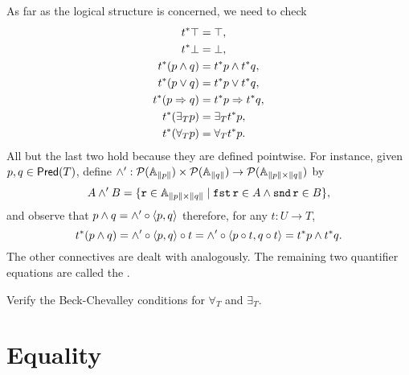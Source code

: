 As far as the logical structure is concerned, we need to check
%
\begin{align*}
  t^{*} \top &= \top,\\
  t^{*} \bot &= \bot,\\
  t^{*} (p \land q) &= t^{*} p \land t^{*} q,\\
  t^{*} (p \lor q) &= t^{*} p \lor t^{*} q,\\
  t^{*} (p \Rightarrow q) &= t^{*} p \Rightarrow t^{*} q,\\
  t^{*} (\exists_{T} p) &= \exists_{T} t^{*} p,\\
  t^{*} (\forall_{T} p) &= \forall_{T} t^{*} p.
\end{align*}
%
All but the last two hold because they are defined pointwise. For instance, given $p, q \in \mathsf{Pred}(T)$, define $\land' : \mathcal{P}(\mathbb{A}_{\|p\|}) \times \mathcal{P}(\mathbb{A}_{\|q\|}) \to \mathcal{P}(\mathbb{A}_{\|p\| \times \|q\|})$ by
%
\begin{equation*}
  A \land' B =
  \{ \mathtt{r} \in \mathbb{A}_{\|p\| \times \|q\|} \mid
    \mathtt{fst}\,\mathtt{r} \in A \land \mathtt{snd}\,\mathtt{r} \in B \},
\end{equation*}
%
and observe that $p \land q = \land' \circ \langle p, q \rangle$ therefore, for any $t : U \to T$,
%
\begin{equation*}
  t^{*}(p \land q) = \land' \circ \langle p, q \rangle \circ t
  = \land' \circ \langle p \circ t, q \circ t \rangle = t^{*} p \land t^{*} q.
\end{equation*}
%
The other connectives are dealt with analogously.
The remaining two quantifier equations are called the .

\begin{exercise}
  Verify the Beck-Chevalley conditions for $\forall_T$ and $\exists_T$.
\end{exercise}

\section{Equality}
\label{sec:equality}

